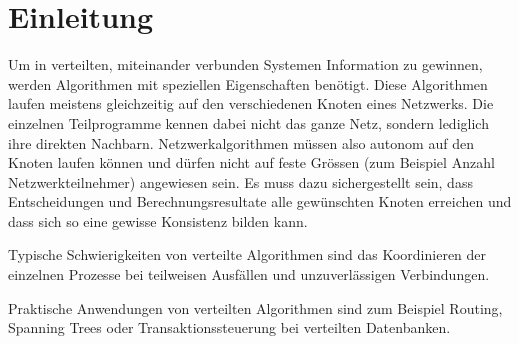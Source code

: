 \chapter{Einleitung}
\label{chap:einleitung}

Um in verteilten, miteinander verbunden Systemen Information zu gewinnen, werden Algorithmen mit speziellen Eigenschaften benötigt. Diese Algorithmen laufen meistens gleichzeitig auf den verschiedenen Knoten eines Netzwerks. Die einzelnen Teilprogramme kennen dabei nicht das ganze Netz, sondern lediglich ihre direkten Nachbarn.
Netzwerkalgorithmen müssen also autonom auf den Knoten laufen können und dürfen nicht auf feste Grössen (zum Beispiel Anzahl Netzwerkteilnehmer) angewiesen sein. Es muss dazu sichergestellt sein, dass Entscheidungen und Berechnungsresultate alle gewünschten Knoten erreichen und dass sich so eine gewisse Konsistenz bilden kann.

Typische Schwierigkeiten von verteilte Algorithmen sind das Koordinieren der einzelnen Prozesse bei teilweisen Ausfällen und unzuverlässigen Verbindungen.

Praktische Anwendungen von verteilten Algorithmen sind zum Beispiel Routing, Spanning Trees oder Transaktionssteuerung bei verteilten Datenbanken. 
